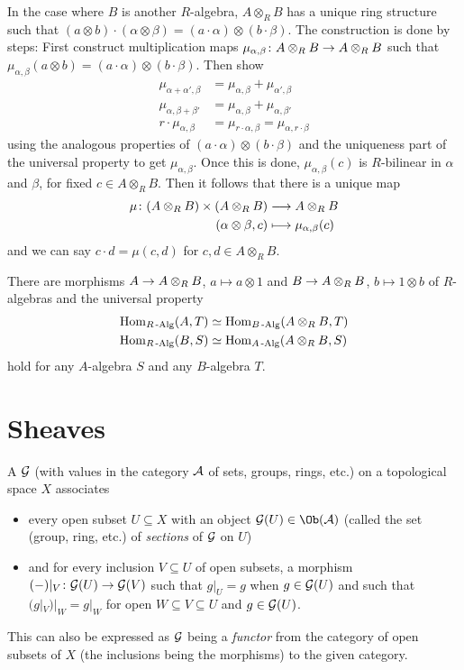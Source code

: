 \documentclass[a4paper,parskip=half,numbers=enddot, DIV=12, headheight=30pt]{scrreprt}
\begin{document}
In the case where $B$ is another $R$-algebra, $A\otimes_R B$ has a unique ring structure such that $(a\otimes b)\cdot(\alpha \otimes \beta) = (a \cdot \alpha)\otimes (b\cdot \beta)$. The construction is done by steps: First construct multiplication maps $\mu_{\alpha, \beta}\colon A\otimes_R B \morphism A\otimes_R B$ such that $\mu_{\alpha,\beta} (a\otimes b) = (a\cdot \alpha)\otimes (b\cdot \beta)$. Then show
\begin{align*}
    \mu_{\alpha+\alpha',\beta} &= \mu_{\alpha,\beta}+\mu_{\alpha',\beta}\\
    \mu_{\alpha,\beta+\beta'} &= \mu_{\alpha,\beta}+\mu_{\alpha,\beta'}\\
    r\cdot \mu_{\alpha,\beta} &= \mu_{r\cdot \alpha,\beta} =\mu_{\alpha,r\cdot \beta}
\end{align*}
using the analogous properties of $(a\cdot \alpha) \otimes (b\cdot \beta)$ and the uniqueness part of the universal property to get $\mu_{\alpha,\beta}$. Once this is done, $\mu_{\alpha,\beta}(c)$ is $R$-bilinear in $\alpha$ and $\beta$, for fixed $c\in A\otimes_R B$. Then it follows that there is a unique map
\begin{align*}
    \mu\colon (A\otimes_R B) \times (A\otimes_R B) &\morphism A\otimes_R B\\
    (\alpha \otimes \beta, c) &\longmapsto \mu_{\alpha,\beta}(c)
\end{align*}
and we can say $c\cdot d = \mu(c,d)$ for $c,d\in A\otimes_R B$.

There are morphisms $A\morphism A\otimes_R B$, $a\mapsto a\otimes 1$ and $B\morphism A\otimes_R B$, $b\mapsto 1\otimes b$ of $R$-algebras and the universal property
\begin{align*}
    \operatorname{Hom}_{R\operatorname{-Alg}} (A,T) &\simeq \operatorname{Hom}_{B\operatorname{-Alg}}(A\otimes_R B, T)\\
    \operatorname{Hom}_{R\operatorname{-Alg}} (B,S) &\simeq \operatorname{Hom}_{A\operatorname{-Alg}}(A\otimes_R B, S)
\end{align*}
hold for any $A$-algebra $S$ and any $B$-algebra $T$.

\section{Sheaves}

\begin{defi}[Presheaf]
    A  $\mathcal{G}$ (with values in the category $\mathcal{A}$ of sets, groups, rings, etc.) on a topological space $X$ associates
    \begin{itemize}
    	\item every open subset $U\subseteq X$ with an object $\Gg(U)\in\Ob(\Aa)$ (called the set (group, ring, etc.) of \emph{sections} of $\mathcal{G}$ on  $U$)
    	\item and for every inclusion $V\subseteq U$ of open subsets, a morphism $(-)|_V\colon \Gg(U)\morphism \Gg(V)$ such that $g|_U = g$ when $g\in \mathcal{G}(U)$ and such that $(g|_V)|_W = g|_W$ for open $W\subseteq V\subseteq U$ and $g\in \mathcal{G}(U)$. 
    \end{itemize}
    This can also be expressed as $\mathcal{G}$ being a \emph{functor} from the category of open subsets of $X$ (the inclusions being the morphisms) to the given category.
\end{defi}
\end{document}
